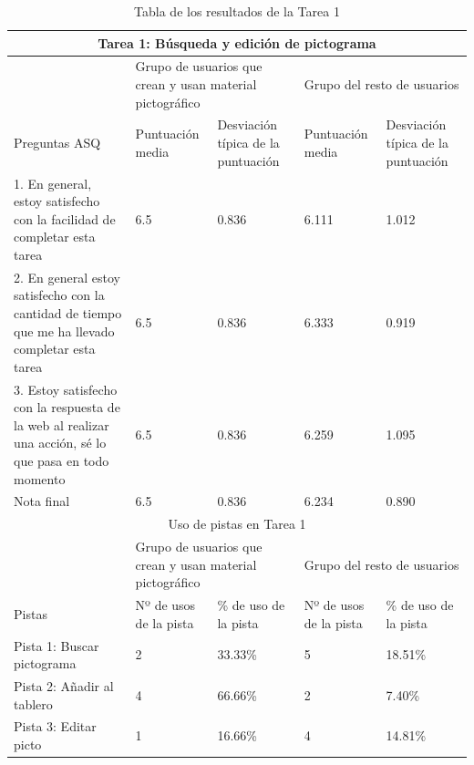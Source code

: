 \begin{table}

\begin{tabular}{ |p{4cm}|p{2cm}|p{2cm}|p{2cm}|p{2cm}|  }
	\hline
	\multicolumn{5}{|c|}{Tarea 1: Búsqueda y edición de pictograma} \\
	\hline
	 & \multicolumn{2}{p{4cm}|}{Grupo de usuarios que crean y usan material pictográfico} & \multicolumn{2}{p{4cm}|}{Grupo del resto de usuarios }  \\ 
	\hline
	 Preguntas ASQ & Puntuación media  &Desviación típica de la puntuación & Puntuación media & Desviación típica de la puntuación\\
	\hline
	1. En general, estoy satisfecho con la facilidad de completar esta tarea &6.5  &0.836 &6.111  &1.012\\
	\hline
	2. En general estoy satisfecho con la cantidad de tiempo que me ha llevado completar esta tarea&6.5  &0.836  &6.333 &0.919\\
	\hline
	3. Estoy satisfecho con la respuesta de la web al realizar una acción, sé lo que pasa en todo momento &6.5 &0.836 & 6.259  &1.095\\
	\hline
	Nota final &6.5 &0.836 &6.234  &0.890\\
	\hline
	\multicolumn{5}{|c|}{Uso de pistas en Tarea 1} \\
	\hline
	& \multicolumn{2}{p{4cm}|}{Grupo de usuarios que crean y usan material pictográfico} & \multicolumn{2}{p{4cm}|}{Grupo del resto de usuarios }  \\ 
	\hline
	 Pistas &Nº de usos de la pista &\% de uso de la pista&Nº de usos de la pista&\% de uso de la pista\\
	\hline
	Pista 1: Buscar pictograma &2  &33.33\% &5  &18.51\%\\
	\hline
	Pista 2: Añadir al tablero &4  &66.66\%  &2 &7.40\%\\
	\hline
	Pista 3: Editar picto &1 &16.66\% &4  &14.81\%\\
	\hline
\end{tabular}
\caption{\label{tab:area1respuestas}Tabla de los resultados de la Tarea 1}
\end{table}

